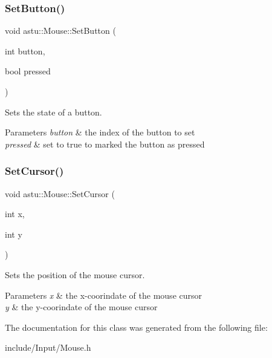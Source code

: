 \subsubsection{\texorpdfstring{Set\+Button()}{SetButton()}}
{\footnotesize\ttfamily void astu\+::\+Mouse\+::\+Set\+Button (\begin{DoxyParamCaption}\item[{int}]{button,  }\item[{bool}]{pressed }\end{DoxyParamCaption})}

Sets the state of a button.


\begin{DoxyParams}{Parameters}
{\em button} & the index of the button to set \\
\hline
{\em pressed} & set to {\ttfamily true} to marked the button as pressed \\
\hline
\end{DoxyParams}
\mbox{\label{classastu_1_1Mouse_a1aebb61a647f115381eeb2d3528fefe8}} 
\subsubsection{\texorpdfstring{Set\+Cursor()}{SetCursor()}}
{\footnotesize\ttfamily void astu\+::\+Mouse\+::\+Set\+Cursor (\begin{DoxyParamCaption}\item[{int}]{x,  }\item[{int}]{y }\end{DoxyParamCaption})}

Sets the position of the mouse cursor.


\begin{DoxyParams}{Parameters}
{\em x} & the x-\/coorindate of the mouse cursor \\
\hline
{\em y} & the y-\/coorindate of the mouse cursor \\
\hline
\end{DoxyParams}


The documentation for this class was generated from the following file\+:\begin{DoxyCompactItemize}
\item 
include/\+Input/Mouse.\+h\end{DoxyCompactItemize}
